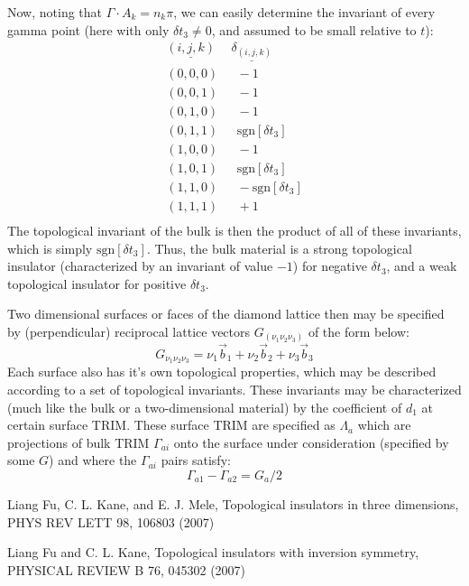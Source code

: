 \documentclass[10pt,a4paper]{article}
\begin{document}
\begin{multicols}{2}
\begin{center}
\end{center}
Now, noting that $\Gamma \cdot A_k = n_k\pi$, we can easily determine the invariant of every gamma point (here with only $\delta t_3 \neq 0$, and assumed to be small relative to $t$):
\begin{align*}
\underline{ (i,j,k)}\ &\ \underline{ \delta_{(i,j,k)}}\\
(0,0,0)& \ \ \ -1\\(0,0,1)& \ \ \ -1\\
(0,1,0)& \ \ \ -1\\
(0,1,1)& \ \ \ \text{sgn}[\delta t_3]\\(1,0,0)& \ \ \ -1\\
(1,0,1)& \ \ \ \text{sgn}[\delta t_3]\\(1,1,0)& \ \ \ -\text{sgn}[\delta t_3]\\
(1,1,1)& \ \ \ +1\\
\end{align*}
The topological invariant of the bulk is then the product of all of these invariants, which is simply $\text{sgn}[\delta t_3]$. Thus, the bulk material is a strong topological insulator (characterized by an invariant of value $-1$) for negative $\delta t_3$, and a weak topological insulator for positive $\delta t_3$. 

Two dimensional surfaces or faces of the diamond lattice then may be specified by (perpendicular) reciprocal lattice vectors $G_{(\nu_1\nu_2\nu_3)}$ of the form below:
$$
G_{\nu_1\nu_2\nu_3}=\nu_1\vec{b}_1+\nu_2\vec{b}_2+\nu_3\vec{b}_3
$$
Each surface also has it's own topological properties, which may be described according to a set of topological invariants. These invariants may be characterized (much like the bulk or a two-dimensional material) by the coefficient of $d_1$ at certain surface TRIM. These surface TRIM are specified as $\Lambda_{a}$ which are projections of bulk TRIM $\Gamma_{ai}$ onto the surface under consideration (specified by some $G$) and where the $\Gamma_{ai}$ pairs satisfy:
$$
\Gamma_{a1}-\Gamma_{a2}=G_a/2
$$
\end{multicols}

\begin{thebibliography}{2}
 Liang Fu, C. L. Kane, and E. J. Mele, Topological insulators in three dimensions, PHYS REV LETT 98, 106803 (2007)

 Liang Fu and C. L. Kane, Topological insulators with inversion symmetry, PHYSICAL REVIEW B 76, 045302 (2007)
\end{thebibliography}
\end{document}
